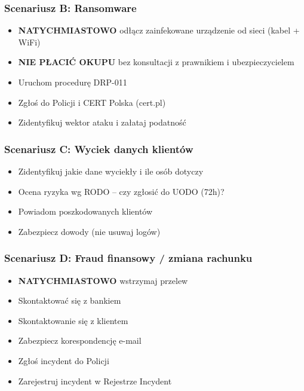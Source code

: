 \documentclass[12pt,a4paper]{article}
\providecommand{\tightlist}{\setlength{\itemsep}{0pt}\setlength{\parskip}{0pt}}
\begin{document}
\subsubsection*{Scenariusz B:
Ransomware}\label{scenariusz-b-ransomware}

\begin{itemize}
\tightlist
\item
  \textbf{NATYCHMIASTOWO} odłącz zainfekowane urządzenie od sieci (kabel
  + WiFi)
\item
  \textbf{NIE PŁACIĆ OKUPU} bez konsultacji z prawnikiem i
  ubezpieczycielem
\item
  Uruchom procedurę DRP-011
\item
  Zgłoś do Policji i CERT Polska (cert.pl)
\item
  Zidentyfikuj wektor ataku i załataj podatność
\end{itemize}

\subsubsection*{Scenariusz C: Wyciek danych
klientów}\label{scenariusz-c-wyciek-danych-klientuxf3w}

\begin{itemize}
\tightlist
\item
  Zidentyfikuj jakie dane wyciekły i ile osób dotyczy
\item
  Ocena ryzyka wg RODO -- czy zgłosić do UODO (72h)?
\item
  Powiadom poszkodowanych klientów
\item
  Zabezpiecz dowody (nie usuwaj logów)
\end{itemize}

\subsubsection*{Scenariusz D: Fraud finansowy / zmiana rachunku}\label{scenariusz-D-kompromitacja-systemu}
\begin{itemize}
\tightlist
\item
\textbf{NATYCHMIASTOWO} wstrzymaj przelew
\item
Skontaktować się z bankiem
\item
Skontaktowanie się z klientem
\item
Zabezpiecz korespondencję e-mail
\item
Zgłoś incydent do Policji
\item 
Zarejestruj incydent w Rejestrze Incydent
\end{itemize}
\end{document}
